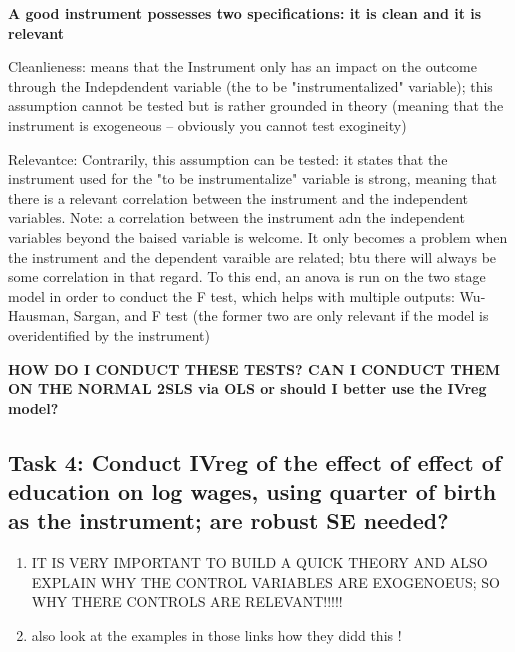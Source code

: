 \documentclass[a4paper]{article}
\begin{document}
\textbf{A good instrument possesses two specifications: it is clean and it is relevant}

Cleanlieness: means that the Instrument only has an impact on the outcome through the Indepdendent variable (the to be "instrumentalized" variable); this assumption cannot be tested but is rather grounded in theory (meaning that the instrument is exogeneous -- obviously you cannot test exogineity)

Relevantce: Contrarily, this assumption can be tested: it states that the instrument used for the "to be instrumentalize" variable is strong, meaning that there is a relevant correlation between the instrument and the independent variables. Note: a correlation between the instrument adn the independent variables beyond the baised variable is welcome. It only becomes a problem when the instrument and the dependent varaible are related; btu there will always be some correlation in that regard. To this end, an anova is run on the two stage model in order to conduct the F test, which helps with multiple outputs: Wu-Hausman, Sargan, and F test (the former two are only relevant if the model is overidentified by the instrument)

\textbf{HOW DO I CONDUCT THESE TESTS? CAN I CONDUCT THEM ON THE NORMAL 2SLS via OLS or should I better use the IVreg model?}



\subsection{Task 4: Conduct IVreg of the effect of effect of education on log wages, using quarter of birth as the instrument; are robust SE needed?}

\begin{enumerate}
   \item IT IS VERY IMPORTANT TO BUILD A QUICK THEORY AND ALSO EXPLAIN WHY THE CONTROL VARIABLES ARE EXOGENOEUS; SO WHY THERE CONTROLS ARE RELEVANT!!!!!
   \item also look at the examples in those links how they didd this !
\end{enumerate}
\end{document}
